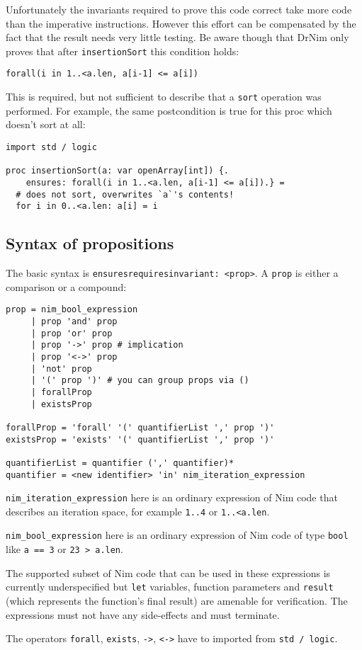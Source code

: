 Unfortunately the invariants required to prove this code correct take
more code than the imperative instructions. However this effort can be
compensated by the fact that the result needs very little testing. Be
aware though that DrNim only proves that after \texttt{insertionSort}
this condition holds:

\begin{verbatim}
forall(i in 1..<a.len, a[i-1] <= a[i])
\end{verbatim}

This is required, but not sufficient to describe that a \texttt{sort}
operation was performed. For example, the same postcondition is true for
this proc which doesn't sort at all:

\begin{verbatim}
import std / logic

proc insertionSort(a: var openArray[int]) {.
    ensures: forall(i in 1..<a.len, a[i-1] <= a[i]).} =
  # does not sort, overwrites `a`'s contents!
  for i in 0..<a.len: a[i] = i
\end{verbatim}

\hypertarget{syntax-of-propositions}{%
\subsection{Syntax of propositions}\label{syntax-of-propositions}}

The basic syntax is
\texttt{ensures\textbar{}requires\textbar{}invariant:\ \textless{}prop\textgreater{}}.
A \texttt{prop} is either a comparison or a compound:

\begin{verbatim}
prop = nim_bool_expression
     | prop 'and' prop
     | prop 'or' prop
     | prop '->' prop # implication
     | prop '<->' prop
     | 'not' prop
     | '(' prop ')' # you can group props via ()
     | forallProp
     | existsProp

forallProp = 'forall' '(' quantifierList ',' prop ')'
existsProp = 'exists' '(' quantifierList ',' prop ')'

quantifierList = quantifier (',' quantifier)*
quantifier = <new identifier> 'in' nim_iteration_expression
\end{verbatim}

\texttt{nim\_iteration\_expression} here is an ordinary expression of
Nim code that describes an iteration space, for example \texttt{1..4} or
\texttt{1..\textless{}a.len}.

\texttt{nim\_bool\_expression} here is an ordinary expression of Nim
code of type \texttt{bool} like \texttt{a\ ==\ 3} or
\texttt{23\ \textgreater{}\ a.len}.

The supported subset of Nim code that can be used in these expressions
is currently underspecified but \texttt{let} variables, function
parameters and \texttt{result} (which represents the function's final
result) are amenable for verification. The expressions must not have any
side-effects and must terminate.

The operators \texttt{forall}, \texttt{exists},
\texttt{-\textgreater{}}, \texttt{\textless{}-\textgreater{}} have to
imported from \texttt{std\ /\ logic}.
